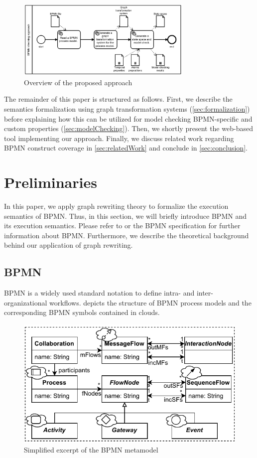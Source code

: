 \documentclass[submission, copyright, creativecommons]{eptcs}
\begin{document}
\begin{figure}[h]
    \centering
    \includegraphics[width=0.75\textwidth]{images/full-approach.pdf}
    \caption{Overview of the proposed approach}
    \label{fig:approach}
\end{figure}

The remainder of this paper is structured as follows.
First, we describe the semantics formalization using graph transformation systems (\cref{sec:formalization}) before explaining how this can be utilized for model checking BPMN-specific and custom properties (\cref{sec:modelChecking}).
Then, we shortly present the web-based tool implementing our approach.
Finally, we discuss related work regarding BPMN construct coverage in \cref{sec:relatedWork} and conclude in \cref{sec:conclusion}.

\section{Preliminaries}
In this paper, we apply graph rewriting theory to formalize the execution semantics of BPMN.
Thus, in this section, we will briefly introduce BPMN and its execution semantics.
Please refer to \cite{freundRealLifeBPMNUsing2019} or the BPMN specification \cite{objectmanagementgroupBusinessProcessModel2013} for further information about BPMN.
Furthermore, we describe the theoretical background behind our application of graph rewriting.
\subsection{BPMN}
BPMN  is a widely used standard notation to define intra- and inter-organizational workflows.
 depicts the structure of BPMN process models and the corresponding BPMN symbols contained in clouds.

\begin{figure}[h]
  \centering
  \includegraphics[width=0.75\linewidth]{images/bpmn_semantics-bpmn-metamodel.pdf}
  \caption{Simplified excerpt of the BPMN metamodel \cite{objectmanagementgroupBusinessProcessModel2013}}
  \label{fig:bpmnMetamodel}
\end{figure}
\end{document}

